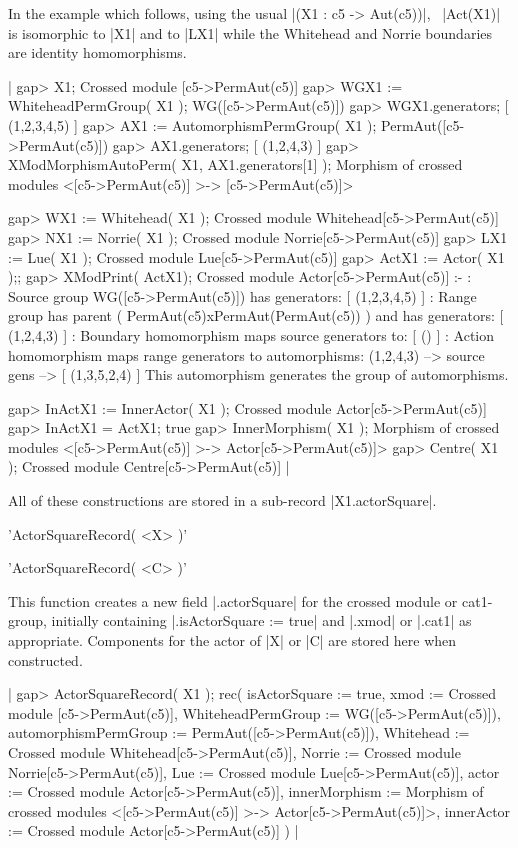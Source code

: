 {In the example which follows, using the usual |(X1 : c5 -> Aut(c5))|,
\ |Act(X1)|  is isomorphic to  |X1|  and to  |LX1|  
while the Whitehead and Norrie boundaries are identity homomorphisms.

|    gap> X1;
    Crossed module [c5->PermAut(c5)]
    gap> WGX1 := WhiteheadPermGroup( X1 );
    WG([c5->PermAut(c5)])
    gap> WGX1.generators;
    [ (1,2,3,4,5) ]
    gap> AX1 := AutomorphismPermGroup( X1 );
    PermAut([c5->PermAut(c5)])
    gap> AX1.generators;
    [ (1,2,4,3) ]
    gap> XModMorphismAutoPerm( X1, AX1.generators[1] );
    Morphism of crossed modules <[c5->PermAut(c5)] >-> [c5->PermAut(c5)]>

    gap> WX1 := Whitehead( X1 );
    Crossed module Whitehead[c5->PermAut(c5)]
    gap> NX1 := Norrie( X1 );
    Crossed module Norrie[c5->PermAut(c5)]
    gap> LX1 := Lue( X1 );
    Crossed module Lue[c5->PermAut(c5)]
    gap> ActX1 := Actor( X1 );;
    gap> XModPrint( ActX1);
    Crossed module Actor[c5->PermAut(c5)] :- 
    : Source group WG([c5->PermAut(c5)]) has generators:
      [ (1,2,3,4,5) ]
    : Range group has parent ( PermAut(c5)xPermAut(PermAut(c5)) )
        and has generators:  [ (1,2,4,3) ]
    : Boundary homomorphism maps source generators to:
      [ () ]
    : Action homomorphism maps range generators to automorphisms:
      (1,2,4,3) --> { source gens --> [ (1,3,5,2,4) ] }
      This automorphism generates the group of automorphisms.

    gap> InActX1 := InnerActor( X1 );
    Crossed module Actor[c5->PermAut(c5)]
    gap> InActX1 = ActX1;
    true
    gap> InnerMorphism( X1 );
    Morphism of crossed modules
        <[c5->PermAut(c5)] >-> Actor[c5->PermAut(c5)]>
    gap> Centre( X1 );
    Crossed module Centre[c5->PermAut(c5)]  |

All of these constructions are stored in a sub-record |X1.actorSquare|.

%

'ActorSquareRecord( <X> )'

'ActorSquareRecord( <C> )'

This function creates a new field |.actorSquare| for the crossed module
or cat1-group, initially containing  |.isActorSquare := true|  and
|.xmod| or |.cat1| as appropriate.  Components for the actor of |X| or |C|
are stored here when constructed.

|    gap> ActorSquareRecord( X1 );
    rec(
      isActorSquare := true,
      xmod := Crossed module [c5->PermAut(c5)],
      WhiteheadPermGroup := WG([c5->PermAut(c5)]),
      automorphismPermGroup := PermAut([c5->PermAut(c5)]),
      Whitehead := Crossed module Whitehead[c5->PermAut(c5)],
      Norrie := Crossed module Norrie[c5->PermAut(c5)],
      Lue := Crossed module Lue[c5->PermAut(c5)],
      actor := Crossed module Actor[c5->PermAut(c5)],
      innerMorphism :=  Morphism of crossed modules
          <[c5->PermAut(c5)] >-> Actor[c5->PermAut(c5)]>,
      innerActor := Crossed module Actor[c5->PermAut(c5)] )  |

}
